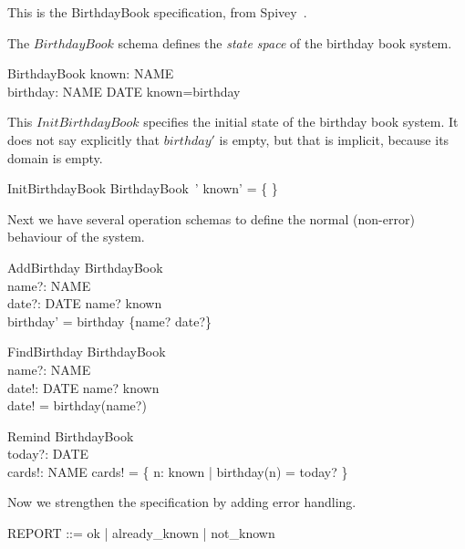\documentclass{article}
\begin{document}
This is the BirthdayBook specification, from 
Spivey~\cite{spivey:z-notation2}.  

\begin{zed}
\end{zed}

The $BirthdayBook$ schema defines the \emph{state space} of 
the birthday book system. 

\begin{schema}{BirthdayBook}
    known: \power NAME \\
    birthday: NAME \pfun DATE
\where
    known=\dom birthday
\end{schema}

This $InitBirthdayBook$ specifies the initial state
of the birthday book system.  It does not say explicitly that
$birthday'$ is empty, but that is implicit, because its domain
is empty.

\begin{schema}{InitBirthdayBook}
    BirthdayBook~'
\where
    known' = \{ \}
\end{schema}

Next we have several operation schemas to define the normal (non-error)
behaviour of the system.

\begin{schema}{AddBirthday}
    \Delta BirthdayBook \\
    name?: NAME \\
    date?: DATE
\where
    name? \notin known \\
    birthday' = birthday \cup \{name? \mapsto date?\}
\end{schema}

\begin{schema}{FindBirthday}
    \Xi BirthdayBook \\
    name?: NAME \\
    date!: DATE 
\where
    name? \in known
\\
    date! = birthday(name?)
\end{schema}

\begin{schema}{Remind}
    \Xi BirthdayBook \\
    today?: DATE \\
    cards!: \power NAME
\where
    cards! = \{ n: known | birthday(n) = today? \}
\end{schema}


Now we strengthen the specification by adding error handling.

\begin{zed} 
    REPORT ::= ok | already\_known | not\_known
\end{zed}
\end{document}
